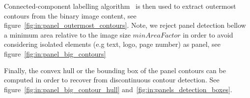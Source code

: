 Connected-component labelling algorithm~\cite{Szeliski2010Computer} is then used to extract outermost contours from the binary image content, see figure~\ref{fig:in:panel_outermost_contours}.
Note, we reject panel detection bellow a minimum area relative to the image size $minAreaFactor$ in order to avoid considering isolated elements (e.g text, logo, page number) as panel, see figure~\ref{fig:in:panel_big_contours}

Finally, the convex hull or the bounding box of the panel contours can be computed in order to recover from discontinuous contour detection.
See figure~\ref{fig:in:panel_big_contour_hull} and~\ref{fig:in:panels_detection_boxes}. 






